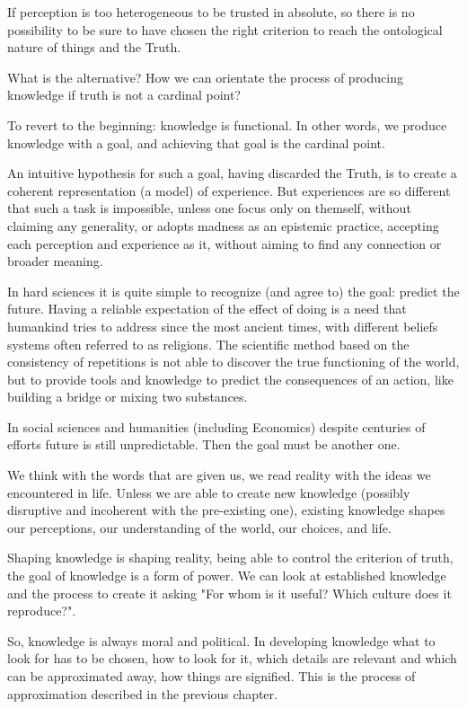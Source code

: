 If perception is too heterogeneous to be trusted in absolute, so there is no possibility to be sure to have chosen the right criterion to reach the ontological nature of things and the Truth.

What is the alternative?
How we can orientate the process of producing knowledge if truth is not a cardinal point?

To revert to the beginning: knowledge is functional.
In other words, we produce knowledge with a goal, and achieving that goal is the cardinal point.

An intuitive hypothesis for such a goal, having discarded the Truth, is to create a coherent representation (a model) of experience.
But experiences are so different that such a task is impossible, unless one focus only on themself, without claiming any generality, or adopts madness as an epistemic practice, accepting each perception and experience as it, without aiming to find any connection or broader meaning.

In hard sciences it is quite simple to recognize (and agree to) the goal: predict the future.
Having a reliable expectation of the effect of doing is a need that humankind tries to address since the most ancient times, with different beliefs systems often referred to as religions.
The scientific method based on the consistency of repetitions is not able to discover the true functioning of the world, but to provide tools and knowledge to predict the consequences of an action, like building a bridge or mixing two substances.

In social sciences and humanities (including Economics) despite centuries of efforts future is still unpredictable.
Then the goal must be another one.

We think with the words that are given us, we read reality with the ideas we encountered in life. Unless we are able to create new knowledge (possibly disruptive and incoherent with the pre-existing one), existing knowledge shapes our perceptions, our understanding of the world, our choices, and life.

Shaping knowledge is shaping reality, being able to control the criterion of truth, the goal of knowledge is a form of power.
We can look at established knowledge and the process to create it asking "For whom is it useful? Which culture does it reproduce?".

So, knowledge is always moral and political.
In developing knowledge what to look for has to be chosen, how to look for it, which details are relevant and which can be approximated away, how things are signified.
This is the process of approximation described in the previous chapter.

